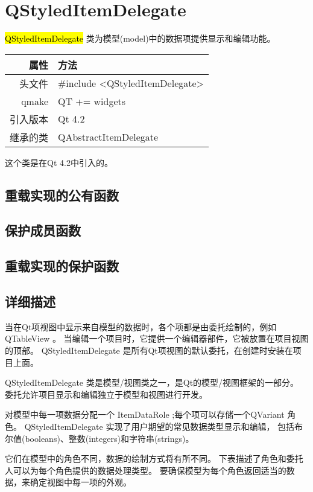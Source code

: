 \chapter{QStyledItemDelegate}

\hl{QStyledItemDelegate} 类为模型(model)中的数据项提供显示和编辑功能。

\begin{tabular}{|r|l|}
	\hline
	属性 & 方法 \\
	\hline
	头文件 & \#include <QStyledItemDelegate>\\      
	\hline
	qmake & QT += widgets\\      
	\hline
	引入版本 &	Qt 4.2 \\ 
	\hline
	继承的类 &	QAbstractItemDelegate \\ 
	\hline
\end{tabular}

这个类是在Qt 4.2中引入的。

\section{重载实现的公有函数}

\section{保护成员函数}

\section{重载实现的保护函数}

\section{详细描述}

当在Qt项视图中显示来自模型的数据时，各个项都是由委托绘制的，例如 QTableView 。
当编辑一个项目时，它提供一个编辑器部件，它被放置在项目视图的顶部。
QStyledItemDelegate 是所有Qt项视图的默认委托，在创建时安装在项目上面。

QStyledItemDelegate 类是模型/视图类之一，是Qt的模型/视图框架的一部分。
委托允许项目显示和编辑独立于模型和视图进行开发。

对模型中每一项数据分配一个 ItemDataRole ;每个项可以存储一个QVariant 角色。
QStyledItemDelegate 实现了用户期望的常见数据类型显示和编辑，
包括布尔值(booleans)、整数(integers)和字符串(strings)。

它们在模型中的角色不同，数据的绘制方式将有所不同。
下表描述了角色和委托人可以为每个角色提供的数据处理类型。
要确保模型为每个角色返回适当的数据，来确定视图中每一项的外观。

